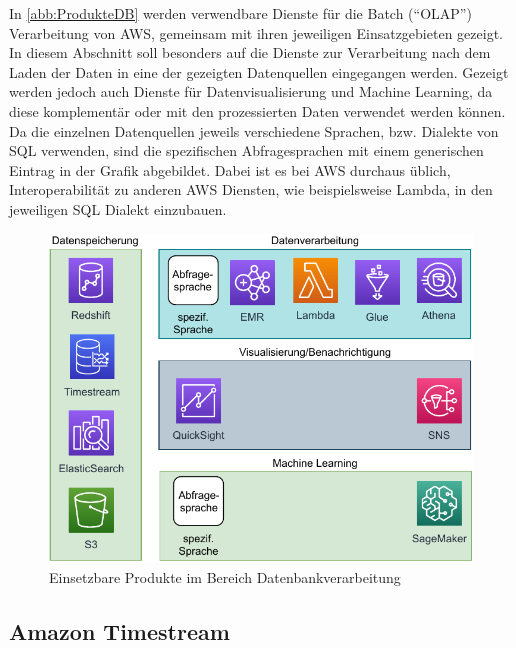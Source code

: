 In \autoref{abb:ProdukteDB} werden verwendbare Dienste für die Batch (\enquote{\ac{OLAP}}) Verarbeitung von \ac{AWS}, gemeinsam mit ihren jeweiligen Einsatzgebieten gezeigt. In diesem Abschnitt soll besonders auf die Dienste zur Verarbeitung nach dem Laden der Daten in eine der gezeigten Datenquellen eingegangen werden. Gezeigt werden jedoch auch Dienste für Datenvisualisierung und Machine Learning, da diese komplementär oder mit den prozessierten Daten verwendet werden können. Da die einzelnen Datenquellen jeweils verschiedene Sprachen, bzw. Dialekte von \ac{SQL} verwenden, sind die spezifischen Abfragesprachen mit einem generischen Eintrag in der Grafik abgebildet. Dabei ist es bei \ac{AWS} durchaus üblich, Interoperabilität zu anderen \ac{AWS} Diensten, wie beispielsweise Lambda, in den jeweiligen \ac{SQL} Dialekt einzubauen.

\begin{figure}[H]
\centering
\includegraphics[width=\textwidth]{graphics/Overview-DB.pdf}
\caption{Einsetzbare Produkte im Bereich Datenbankverarbeitung}
\label{abb:ProdukteDB}
\end{figure}


\subsection{Amazon Timestream}






